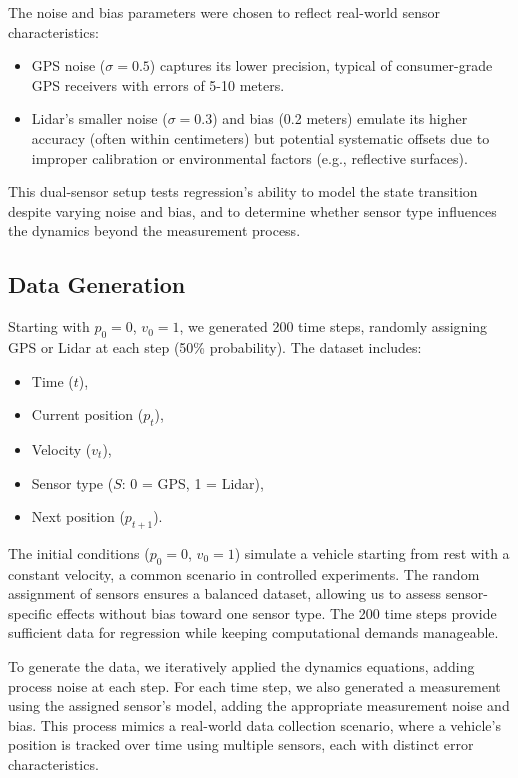 \documentclass[12pt]{article}
\begin{document}
The noise and bias parameters were chosen to reflect real-world sensor characteristics:
\begin{itemize}
    \item GPS noise (\( \sigma = 0.5 \)) captures its lower precision, typical of consumer-grade GPS receivers with errors of 5-10 meters.
    \item Lidar’s smaller noise (\( \sigma = 0.3 \)) and bias (0.2 meters) emulate its higher accuracy (often within centimeters) but potential systematic offsets due to improper calibration or environmental factors (e.g., reflective surfaces).
\end{itemize}

This dual-sensor setup tests regression’s ability to model the state transition despite varying noise and bias, and to determine whether sensor type influences the dynamics beyond the measurement process.

\subsection{Data Generation}
\label{subsec:data_generation}

Starting with \( p_0 = 0 \), \( v_0 = 1 \), we generated 200 time steps, randomly assigning GPS or Lidar at each step (50\% probability). The dataset includes:
\begin{itemize}
    \item Time (\( t \)),
    \item Current position (\( p_t \)),
    \item Velocity (\( v_t \)),
    \item Sensor type (\( S \): 0 = GPS, 1 = Lidar),
    \item Next position (\( p_{t+1} \)).
\end{itemize}

The initial conditions (\( p_0 = 0 \), \( v_0 = 1 \)) simulate a vehicle starting from rest with a constant velocity, a common scenario in controlled experiments. The random assignment of sensors ensures a balanced dataset, allowing us to assess sensor-specific effects without bias toward one sensor type. The 200 time steps provide sufficient data for regression while keeping computational demands manageable.

To generate the data, we iteratively applied the dynamics equations, adding process noise at each step. For each time step, we also generated a measurement using the assigned sensor’s model, adding the appropriate measurement noise and bias. This process mimics a real-world data collection scenario, where a vehicle’s position is tracked over time using multiple sensors, each with distinct error characteristics.
\end{document}
